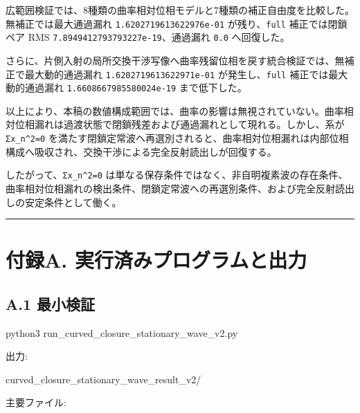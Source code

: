 \documentclass[
  a4paper,
]{article}
\newenvironment{Shaded}{}{}
\newcommand{\NormalTok}[1]{#1}
\begin{document}
広範囲検証では、8種類の曲率相対位相モデルと7種類の補正自由度を比較した。無補正では最大通過漏れ
\texttt{1.6202719613622976e-01} が残り、\texttt{full} 補正では閉鎖ペア
RMS \texttt{7.8949412793793227e-19}、通過漏れ \texttt{0.0} へ回復した。

さらに、片側入射の局所交換干渉写像へ曲率残留位相を戻す統合検証では、無補正で最大動的通過漏れ
\texttt{1.6202719613622971e-01} が発生し、\texttt{full}
補正では最大動的通過漏れ \texttt{1.6608667985580024e-19} まで低下した。

以上により、本稿の数値構成範囲では、曲率の影響は無視されていない。曲率相対位相漏れは過渡状態で閉鎖残差および通過漏れとして現れる。しかし、系が
\texttt{Σx\_n\^{}2=0}
を満たす閉鎖定常波へ再選別されると、曲率相対位相漏れは内部位相構成へ吸収され、交換干渉による完全反射読出しが回復する。

したがって、\texttt{Σx\_n\^{}2=0}
は単なる保存条件ではなく、非自明複素波の存在条件、曲率相対位相漏れの検出条件、閉鎖定常波への再選別条件、および完全反射読出しの安定条件として働く。

\begin{center}\rule{0.5\linewidth}{0.5pt}\end{center}

\section{付録A.
実行済みプログラムと出力}\label{ux4ed8ux9332a.-ux5b9fux884cux6e08ux307fux30d7ux30edux30b0ux30e9ux30e0ux3068ux51faux529b}

\subsection{A.1 最小検証}\label{a.1-ux6700ux5c0fux691cux8a3c}

\begin{Shaded}
\begin{Highlighting}[]
\NormalTok{python3 run\_curved\_closure\_stationary\_wave\_v2.py}
\end{Highlighting}
\end{Shaded}

出力:

\begin{Shaded}
\begin{Highlighting}[]
\NormalTok{curved\_closure\_stationary\_wave\_result\_v2/}
\end{Highlighting}
\end{Shaded}

主要ファイル:
\end{document}

